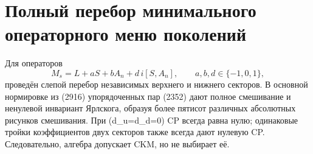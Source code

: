 \section*{Полный перебор минимального операторного меню поколений}

Для операторов
\[
 M_s=L+aS+bA_n+d\,i[S,A_n],
 \qquad a,b,d\in\{-1,0,1\},
\]
проведён слепой перебор независимых верхнего и нижнего секторов. В основной
нормировке из (2916) упорядоченных пар (2352) дают полное смешивание и
ненулевой инвариант Ярлскога, образуя более пятисот различных абсолютных
рисунков смешивания. При (d_u=d_d=0) CP всегда равна нулю; одинаковые
тройки коэффициентов двух секторов также всегда дают нулевую CP. Следовательно,
алгебра допускает CKM, но не выбирает её.